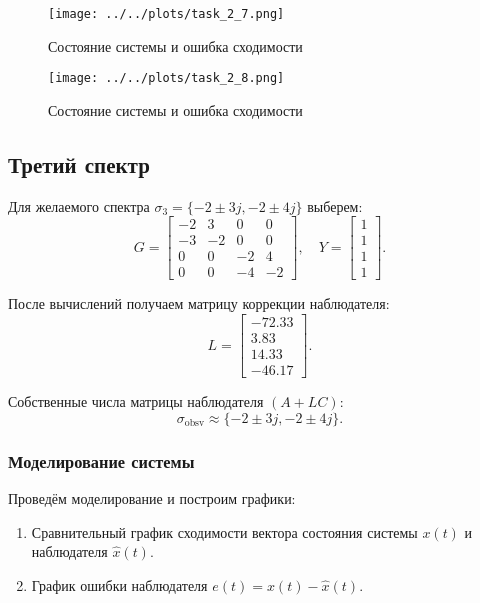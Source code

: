 \begin{figure}[H]
    \centering
    \texttt{[image: ../../plots/task\_2\_7.png]}
    \caption{Состояние системы и ошибка сходимости}
    \label{fig:task_2_state_error_system_2_3}
\end{figure}

\begin{figure}[H]
    \centering
    \texttt{[image: ../../plots/task\_2\_8.png]}
    \caption{Состояние системы и ошибка сходимости}
    \label{fig:task_2_state_error_system_2_4}
\end{figure}


\subsection{Третий спектр}

Для желаемого спектра $\sigma_3 = \{-2 \pm 3j, -2 \pm 4j\}$ выберем:
\[
G = \begin{bmatrix}
    -2 & 3 & 0 & 0 \\
    -3 & -2 & 0 & 0 \\
    0 & 0 & -2 & 4 \\
    0 & 0 & -4 & -2 \end{bmatrix}, \quad
Y = \begin{bmatrix}
    1 \\
    1 \\
    1 \\
    1
\end{bmatrix}.
\]

После вычислений получаем матрицу коррекции наблюдателя:
\[
L = \begin{bmatrix}
    -72.33 \\
    3.83 \\
    14.33 \\
    -46.17
\end{bmatrix}.
\]

Собственные числа матрицы наблюдателя $(A + LC)$:
\[
\sigma_{\text{obsv}} \approx \{-2 \pm 3j, -2 \pm 4j\}.
\]

\subsubsection{Моделирование системы}

Проведём моделирование и построим графики:
\begin{enumerate}
    \item Сравнительный график сходимости вектора состояния системы $x(t)$ и наблюдателя $\hat{x}(t)$.
    \item График ошибки наблюдателя $e(t) = x(t) - \hat{x}(t)$.
\end{enumerate}

